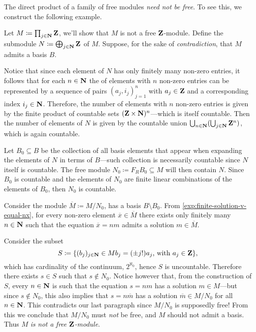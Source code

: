 \begin{remark}
\label{rem:direct-product-not-free}
The direct product of a family of free modules \emph{need not be free}. To see
this, we construct the following example.

Let \(M \coloneq \prod_{j \in \mathbf{N}} \mathbf{Z}\), we'll show that \(M\) is not a free
\(\mathbf{Z}\)-module. Define the submodule \(N \coloneq \bigoplus_{j \in \mathbf{N}} \mathbf{Z}\) of
\(M\). Suppose, for the sake of \emph{contradiction}, that \(M\) admits a basis
\(B\).

Notice that since each element of \(N\) has only finitely many non-zero entries,
it follows that for each \(n \in \mathbf{N}\) the of elements with \(n\) non-zero
entries can be represented by a sequence of pairs \((a_j, i_j)_{j=1}^n\) with
\(a_j \in \mathbf{Z}\) and a corresponding index \(i_j \in \mathbf{N}\). Therefore, the number
of elements with \(n\) non-zero entries is given by the finite product of
countable sets \((\mathbf{Z} \times \mathbf{N})^n\)---which is itself countable. Then the
number of elements of \(N\) is given by the countable union
\(\bigcup_{n \in \mathbf{N}} (\bigcup_{j \in \mathbf{N}} \mathbf{Z}^n)\), which is again countable.

Let \(B_0 \subseteq B\) be the collection of all basis elements that appear when
expanding the elements of \(N\) in terms of \(B\)---such collection is
necessarily countable since \(N\) itself is countable. The free module
\(N_0 \coloneq F_R B_0 \subseteq M\) will then contain \(N\). Since \(B_0\) is
countable and the elements of \(N_0\) are finite linear combinations of the
elements of \(B_0\), then \(N_0\) is countable.

Consider the module \(\overline{M} \coloneq M/N_0\), has a basis
\(B \setminus B_0\). From \cref{exp:finite-solution-v-equal-nx}, for every non-zero
element \(\overline{x} \in \overline{M}\) there exists only finitely many
\(n \in \mathbf{N}\) such that the equation \(\overline{x} = n m\) admits a solution
\(m \in \overline{M}\).

Consider the subset
\[
S \coloneq \{(b_{j})_{j \in \mathbf{N}} \in M \relax
b_j = (\pm j!) a_j\text{, with } a_j \in \mathbf{Z}\},
\]
which has cardinality of the continuum, \(2^{\aleph_0}\), hence \(S\) is
uncountable. Therefore there exists \(s \in S\) such that \(s \notin
N_0\). Notice however that, from the construction of \(S\), every \(n \in \mathbf{N}\) is
such that the equation \(s = n m\) has a solution \(m \in M\)---but since
\(s \notin N_{0}\), this also implies that \(s = n \overline{m}\) has a solution
\(\overline{m} \in M/N_0\) for all \(n \in \mathbf{N}\). This contradicts our last
paragraph since \(M/N_0\) is supposedly free! From this we conclude that
\(M/N_0\) must \emph{not} be free, and \(M\) should not admit a basis. Thus
\(M\) \emph{is not a free \(\mathbf{Z}\)-module}.
\end{remark}

